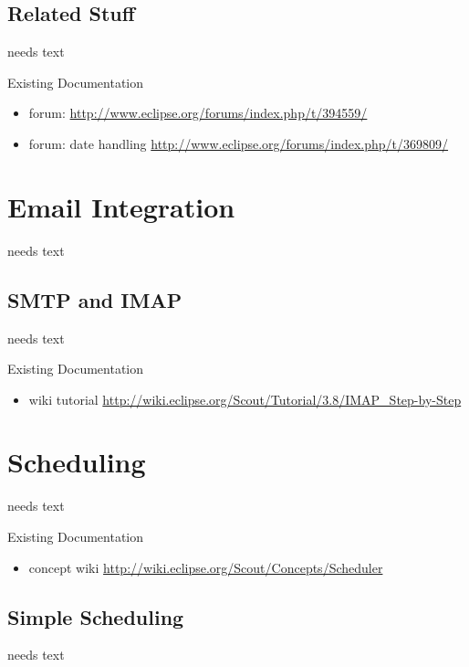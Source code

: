 \documentclass[a4paper,10pt,twoside]{book}
\begin{document}
\section{Related Stuff}
needs text

\noindent Existing Documentation
\begin{itemize}
  \item forum: \url{http://www.eclipse.org/forums/index.php/t/394559/}
  \item forum: date handling \url{http://www.eclipse.org/forums/index.php/t/369809/}
\end{itemize}

\chapter{Email Integration}
needs text

\section{SMTP and IMAP}
needs text

\noindent Existing Documentation
\begin{itemize}
  \item wiki tutorial \url{http://wiki.eclipse.org/Scout/Tutorial/3.8/IMAP_Step-by-Step}
  \end{itemize}

\chapter{Scheduling}
needs text

\noindent Existing Documentation
\begin{itemize}
  \item concept wiki \url{http://wiki.eclipse.org/Scout/Concepts/Scheduler}
\end{itemize}

\section{Simple Scheduling}
needs text

\end{document}
